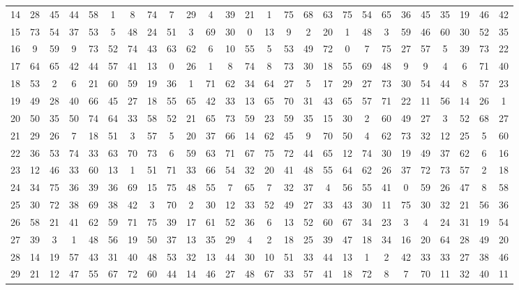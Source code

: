 \begin{table}
\begin{tabular}{c c c c c c c c c c c c c c c c c c c c c c c c c c }
14 & 28 & 45 & 44 & 58 & 1 & 8 & 74 & 7 & 29 & 4 & 39 & 21 & 1 & 75 & 68 & 63 & 75 & 54 & 65 & 36 & 45 & 35 & 19 & 46 & 42 \\
15 & 73 & 54 & 37 & 53 & 5 & 48 & 24 & 51 & 3 & 69 & 30 & 0 & 13 & 9 & 2 & 20 & 1 & 48 & 3 & 59 & 46 & 60 & 30 & 52 & 35 \\
16 & 9 & 59 & 9 & 73 & 52 & 74 & 43 & 63 & 62 & 6 & 10 & 55 & 5 & 53 & 49 & 72 & 0 & 7 & 75 & 27 & 57 & 5 & 39 & 73 & 22 \\
17 & 64 & 65 & 42 & 44 & 57 & 41 & 13 & 0 & 26 & 1 & 8 & 74 & 8 & 73 & 30 & 18 & 55 & 69 & 48 & 9 & 9 & 4 & 6 & 71 & 40 \\
18 & 53 & 2 & 6 & 21 & 60 & 59 & 19 & 36 & 1 & 71 & 62 & 34 & 64 & 27 & 5 & 17 & 29 & 27 & 73 & 30 & 54 & 44 & 8 & 57 & 23 \\
19 & 49 & 28 & 40 & 66 & 45 & 27 & 18 & 55 & 65 & 42 & 33 & 13 & 65 & 70 & 31 & 43 & 65 & 57 & 71 & 22 & 11 & 56 & 14 & 26 & 1 \\
20 & 50 & 35 & 50 & 74 & 64 & 33 & 58 & 52 & 21 & 65 & 73 & 59 & 23 & 59 & 35 & 15 & 30 & 2 & 60 & 49 & 27 & 3 & 52 & 68 & 27 \\
21 & 29 & 26 & 7 & 18 & 51 & 3 & 57 & 5 & 20 & 37 & 66 & 14 & 62 & 45 & 9 & 70 & 50 & 4 & 62 & 73 & 32 & 12 & 25 & 5 & 60 \\
22 & 36 & 53 & 74 & 33 & 63 & 70 & 73 & 6 & 59 & 63 & 71 & 67 & 75 & 72 & 44 & 65 & 12 & 74 & 30 & 19 & 49 & 37 & 62 & 6 & 16 \\
23 & 12 & 46 & 33 & 60 & 13 & 1 & 51 & 71 & 33 & 66 & 54 & 32 & 20 & 41 & 48 & 55 & 64 & 62 & 26 & 37 & 72 & 73 & 57 & 2 & 18 \\
24 & 34 & 75 & 36 & 39 & 36 & 69 & 15 & 75 & 48 & 55 & 7 & 65 & 7 & 32 & 37 & 4 & 56 & 55 & 41 & 0 & 59 & 26 & 47 & 8 & 58 \\
25 & 30 & 72 & 38 & 69 & 38 & 42 & 3 & 70 & 2 & 30 & 12 & 33 & 52 & 49 & 27 & 33 & 43 & 30 & 11 & 75 & 30 & 32 & 21 & 56 & 36 \\
26 & 58 & 21 & 41 & 62 & 59 & 71 & 75 & 39 & 17 & 61 & 52 & 36 & 6 & 13 & 52 & 60 & 67 & 34 & 23 & 3 & 4 & 24 & 31 & 19 & 54 \\
27 & 39 & 3 & 1 & 48 & 56 & 19 & 50 & 37 & 13 & 35 & 29 & 4 & 2 & 18 & 25 & 39 & 47 & 18 & 34 & 16 & 20 & 64 & 28 & 49 & 20 \\
28 & 14 & 19 & 57 & 43 & 31 & 40 & 48 & 53 & 32 & 13 & 44 & 30 & 10 & 51 & 33 & 44 & 13 & 1 & 2 & 42 & 33 & 33 & 27 & 38 & 46 \\
29 & 21 & 12 & 47 & 55 & 67 & 72 & 60 & 44 & 14 & 46 & 27 & 48 & 67 & 33 & 57 & 41 & 18 & 72 & 8 & 7 & 70 & 11 & 32 & 40 & 11 \\

\end{tabular}
\end{table}
